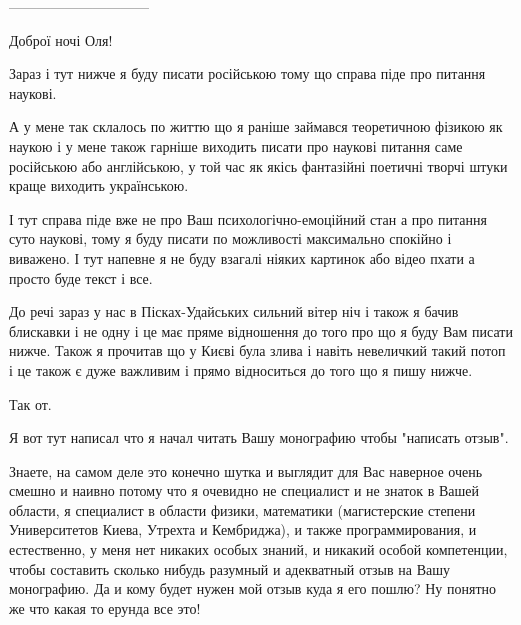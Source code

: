 ------------------------------

Доброї ночі Оля! 

Зараз і тут нижче я буду писати російською тому що справа піде про питання
наукові.

А у мене так склалось по життю що я раніше займався теоретичною фізикою як
наукою і у мене також гарніше виходить писати про наукові питання саме
російською або англійською, у той час як якісь фантазійні поетичні творчі штуки
краще виходить українською.

І тут справа піде вже не про Ваш психологічно-емоційний стан а про питання суто
наукові, тому я буду писати по можливості максимально спокійно і виважено. І
тут напевне я не буду взагалі ніяких картинок або відео пхати а просто буде
текст і все.

До речі зараз у нас в Пісках-Удайських сильний вітер ніч і також я бачив
блискавки і не одну і це має пряме відношення до того про що я буду Вам писати
нижче. Також я прочитав що у Києві була злива і навіть невеличкий такий потоп і
це також є дуже важливим і прямо відноситься до того що я пишу нижче.

Так от.

Я вот тут написал что я начал читать Вашу монографию чтобы "написать отзыв".

Знаете, на самом деле это конечно шутка и выглядит для Вас наверное очень
смешно и наивно потому что я очевидно не специалист и не знаток в Вашей
области, я специалист в области физики, математики (магистерские степени
Университетов Киева, Утрехта и Кембриджа), и также программирования, и
естественно, у меня нет никаких особых знаний, и никакий особой компетенции,
чтобы составить сколько нибудь разумный и адекватный отзыв на Вашу монографию.
Да и кому будет нужен мой отзыв куда я его пошлю? Ну понятно же что какая то
ерунда все это!

